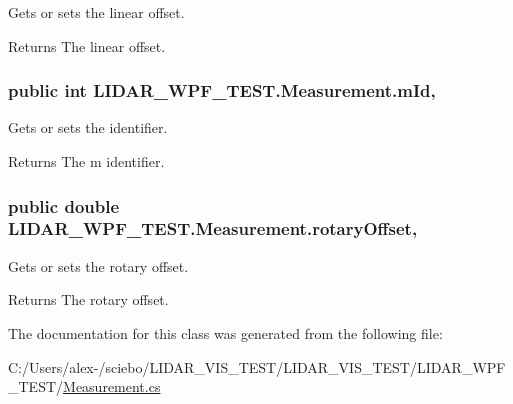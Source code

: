 Gets or sets the linear offset. 

\begin{DoxyReturn}{Returns}
The linear offset. 
\end{DoxyReturn}
\hypertarget{class_l_i_d_a_r___w_p_f___t_e_s_t_1_1_measurement_aca7cf93485898f63b544f86b724a4f8d}{}
\subsubsection[{m\+Id}]{\setlength{\rightskip}{0pt plus 5cm}public int L\+I\+D\+A\+R\+\_\+\+W\+P\+F\+\_\+\+T\+E\+S\+T.\+Measurement.\+m\+Id\hspace{0.3cm}{\ttfamily [get]}, {\ttfamily [set]}}\label{class_l_i_d_a_r___w_p_f___t_e_s_t_1_1_measurement_aca7cf93485898f63b544f86b724a4f8d}


Gets or sets the identifier. 

\begin{DoxyReturn}{Returns}
The m identifier. 
\end{DoxyReturn}
\hypertarget{class_l_i_d_a_r___w_p_f___t_e_s_t_1_1_measurement_a711a9fb756fea70444b65523eab7d9fd}{}
\subsubsection[{rotary\+Offset}]{\setlength{\rightskip}{0pt plus 5cm}public double L\+I\+D\+A\+R\+\_\+\+W\+P\+F\+\_\+\+T\+E\+S\+T.\+Measurement.\+rotary\+Offset\hspace{0.3cm}{\ttfamily [get]}, {\ttfamily [set]}}\label{class_l_i_d_a_r___w_p_f___t_e_s_t_1_1_measurement_a711a9fb756fea70444b65523eab7d9fd}


Gets or sets the rotary offset. 

\begin{DoxyReturn}{Returns}
The rotary offset. 
\end{DoxyReturn}


The documentation for this class was generated from the following file\+:\begin{DoxyCompactItemize}
\item 
C\+:/\+Users/alex-\//sciebo/\+L\+I\+D\+A\+R\+\_\+\+V\+I\+S\+\_\+\+T\+E\+S\+T/\+L\+I\+D\+A\+R\+\_\+\+V\+I\+S\+\_\+\+T\+E\+S\+T/\+L\+I\+D\+A\+R\+\_\+\+W\+P\+F\+\_\+\+T\+E\+S\+T/\hyperlink{_measurement_8cs}{Measurement.\+cs}\end{DoxyCompactItemize}
